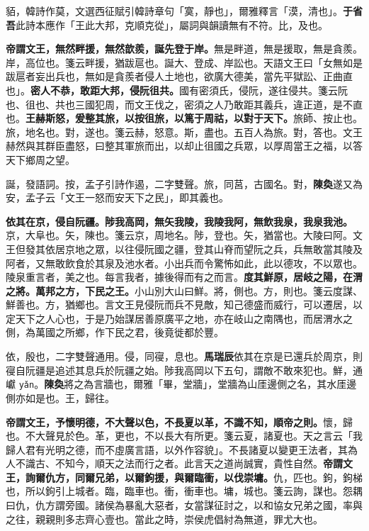 \begin{quoting}貊，韓詩作莫，文選西征賦引韓詩章句「寞，靜也」，爾雅釋言「漠，清也」。\textbf{于省吾}此詩本應作「王此大邦，克順克從」，屬詞與韻讀無有不符。比，及也。\end{quoting}

\textbf{帝謂文王，無然畔援，無然歆羨，誕先登于岸。}{\footnotesize 無是畔道，無是援取，無是貪羨。岸，高位也。箋云畔援，猶跋扈也。誕大、登成、岸訟也。天語文王曰「女無如是跋扈者妄出兵也，無如是貪羨者侵人土地也，欲廣大德美，當先平獄訟、正曲直也」。}\textbf{密人不恭，敢距大邦，侵阮徂共。}{\footnotesize 國有密須氏，侵阮，遂往侵共。箋云阮也、徂也、共也三國犯周，而文王伐之，密須之人乃敢距其義兵，違正道，是不直也。}\textbf{王赫斯怒，爰整其旅，以按徂旅，以篤于周祜，以對于天下。}{\footnotesize 旅師、按止也。旅，地名也。對，遂也。箋云赫，怒意。斯，盡也。五百人為旅。對，答也。文王赫然與其群臣盡怒，曰整其軍旅而出，以却止徂國之兵眾，以厚周當王之福，以答天下鄉周之望。}

\begin{quoting}誕，發語詞。按，孟子引詩作遏，二字雙聲。旅，同莒，古國名。對，\textbf{陳奐}遂又為安，孟子云「文王一怒而安天下之民」，即其義也。\end{quoting}

\textbf{依其在京，侵自阮疆。陟我高岡，無矢我陵，我陵我阿，無飲我泉，我泉我池。}{\footnotesize 京，大阜也。矢，陳也。箋云京，周地名。陟，登也。矢，猶當也。大陵曰阿。文王但發其依居京地之眾，以往侵阮國之疆，登其山脊而望阮之兵，兵無敢當其陵及阿者，又無敢飲食於其泉及池水者。小出兵而令驚怖如此，此以德攻，不以眾也。陵泉重言者，美之也。每言我者，據後得而有之而言。}\textbf{度其鮮原，居岐之陽，在渭之將。萬邦之方，下民之王。}{\footnotesize 小山別大山曰鮮。將，側也。方，則也。箋云度謀、鮮善也。方，猶鄉也。言文王見侵阮而兵不見敵，知己德盛而威行，可以遷居，以定天下之人心也，于是乃始謀居善原廣平之地，亦在岐山之南隅也，而居渭水之側，為萬國之所鄉，作下民之君，後竟徙都於豐。}

\begin{quoting}依，殷也，二字雙聲通用。侵，同寑，息也。\textbf{馬瑞辰}依其在京是已還兵於周京，則寑自阮疆是追述其息兵於阮疆之始。陟我高岡以下五句，謂敵不敢來犯也。鮮，通巘 \texttt{yǎn}。\textbf{陳奐}將之為言牆也，爾雅「畢，堂牆」，堂牆為山厓邊側之名，其水厓邊側亦如是也。王，歸往。\end{quoting}

\textbf{帝謂文王，予懷明德，不大聲以色，不長夏以革，不識不知，順帝之則。}{\footnotesize 懷，歸也。不大聲見於色。革，更也，不以長大有所更。箋云夏，諸夏也。天之言云「我歸人君有光明之德，而不虛廣言語，以外作容貌」。不長諸夏以變更王法者，其為人不識古、不知今，順天之法而行之者。此言天之道尚誠實，貴性自然。}\textbf{帝謂文王，詢爾仇方，同爾兄弟，以爾鉤援，與爾臨衝，以伐崇墉。}{\footnotesize 仇，匹也。鉤，鉤梯也，所以鉤引上城者。臨，臨車也。衝，衝車也。墉，城也。箋云詢，謀也。怨耦曰仇，仇方謂旁國。諸侯為暴亂大惡者，女當謀征討之，以和協女兄弟之國，率與之往，親親則多志齊心壹也。當此之時，崇侯虎倡紂為無道，罪尤大也。}

